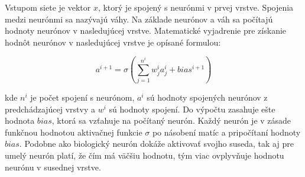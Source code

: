 Vstupom siete je vektor \begin{math}x\end{math}, ktorý je spojený s neurónmi v prvej vrstve. Spojenia medzi neurónmi sa nazývajú váhy. Na základe neurónov a váh sa počítajú hodnoty neurónov v nasledujúcej vrstve. Matematické vyjadrenie pre získanie hodnôt neurónov v nasledujúcej vrstve je opísané formulou:

\begingroup
\large
\begin{equation}a^{i+1} = \sigma \left ( \sum_{j=1}^{n^i} w_{j}^i a_{j}^i + bias^{i+1} \right ) \end{equation}
\endgroup
 
kde \begin{math}n^{i}\end{math} je počet spojení s neurónom, \begin{math}a^{i}\end{math} sú hodnoty spojených neurónov z predchádzajúcej vrstvy a \begin{math}w^{i}\end{math} sú hodnoty spojení. Do výpočtu zasahuje ešte hodnota \begin{math}bias\end{math}, ktorá sa vzťahuje na počítaný neurón. Každý neurón je v zásade funkčnou hodnotou aktivačnej funkcie \begin{math}\sigma\end{math} po násobení matíc a pripočítaní hodnoty \begin{math}bias\end{math}. Podobne ako biologický neurón dokáže aktivovať svojho suseda, tak aj pre umelý neurón platí, že čím má väčšiu hodnotu, tým viac ovplyvňuje hodnotu neurónu v susednej vrstve.



